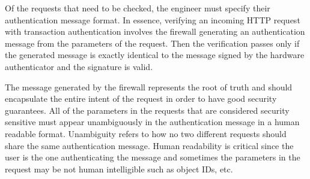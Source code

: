 Of the requests that need to be checked, the engineer must specify their authentication message format. In essence, verifying an incoming HTTP request with transaction authentication involves the firewall generating an authentication message from the parameters of the request. Then the verification passes only if the generated message is exactly identical to the message signed by the hardware authenticator and the signature is valid.

The message generated by the firewall represents the root of truth and should encapsulate the entire intent of the request in order to have good security guarantees. All of the parameters in the requests that are considered security sensitive must appear unambiguously in the authentication message in a human readable format. Unambiguity refers to how no two different requests should share the same authentication message. Human readability is critical since the user is the one authenticating the message and sometimes the parameters in the request may be not human intelligible such as object IDs, etc.

\iffalse
is reconfigured to issue backend requests to the IP address

Upon opening the web page, requests are issued from the web-browser

has two options to specify how a route gets verified.

This message should encapsulate 

also included in the request and the associated signature is valid.
\fi
